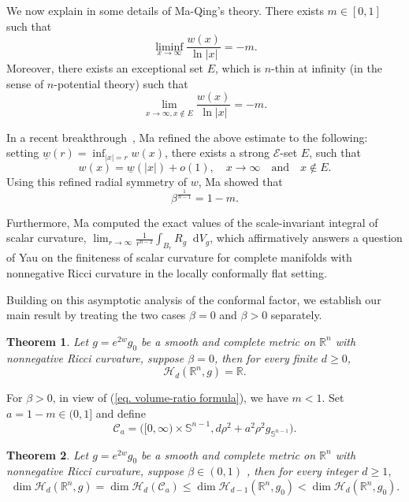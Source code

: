 \documentclass[10pt,a4paper]{amsart}
\newtheorem{theoremx}{Theorem}
\numberwithin{equation}{section}
\newcommand{\R}{\mathbb{R}}
\newcommand{\dd}{\mathop{}\!\mathrm{d}}%
\begin{document}
We now explain in some details of Ma-Qing's theory. There exists $m\in [0,1]$ such that 
\[
    \liminf_{x\to \infty} \frac{w(x)}{\ln |x|}=-m.
\]
Moreover, there exists an exceptional set $E$, which is $n$-thin at infinity (in the sense of $n$-potential theory) such that 
\[
\lim_{x\to \infty, x\notin E} \frac{w(x)}{\ln |x|}=-m.
\]

In a recent breakthrough~\cite{M}, Ma refined the above estimate to the following: setting $\underline{w}(r)=\inf_{|x|=r} w(x)$, there exists a strong  $\mathcal{E}$-set $E$, such that 
\begin{equation} \label{eq:asympradial}
w(x)=\underline{w}(|x|)+o(1), \quad x\to \infty \quad \text{and} \quad x\notin E.
\end{equation}
Using this refined radial symmetry of $w$, Ma \cite{M} showed that 
\begin{equation}\label{eq. volume-ratio formula}
    \beta^{\frac{1}{n-1}}=1-m.
\end{equation}

Furthermore, Ma computed the exact values of the scale-invariant integral of scalar curvature, $\lim_{r\to \infty} \frac{1}{r^{n-2}}\int_{B_r} R_g \dd V_g$, which affirmatively answers a question of Yau on the finiteness of scalar curvature for complete manifolds with nonnegative Ricci curvature in the locally conformally flat setting.

Building on this asymptotic analysis of the conformal factor, we establish our main result by treating the two cases $\beta=0$ and $\beta>0$ separately.

\begin{theoremx} \label{thm: T1}
    Let $g=e^{2w}g_{0}$ be a smooth and complete metric on $\mathbb{R}^n$ with nonnegative Ricci curvature, suppose $\beta=0$, then for every finite $d\ge0$,
\[
 \mathcal{H}_d(\R^n,g)=\R.
\]
\end{theoremx}


{For $\beta>0$, in view of (\ref{eq. volume-ratio formula}), we have $m<1$. Set $a=1-m\in (0,1]$ and define 
\[
\mathcal{C}_a=
    \bigl([0,\infty)\times\mathbb S^{n-1},
    d\rho^2+a^2\rho^2g_{\mathbb S^{n-1}}\bigr).
\]}
\begin{theoremx} \label{thm:T2}
        Let $g=e^{2w}g_{0}$ be a smooth and complete metric on $\mathbb{R}^n$ with nonnegative Ricci curvature, suppose $\beta\in (0,1)$ , then for every integer $d\ge1$,
\[
 \dim \mathcal{H}_d(\R^n,g)=\dim \mathcal{H}_d(\mathcal{C}_a) \leq \dim \mathcal{H}_{d-1}(\mathbb{R}^n, g_0)<\dim \mathcal{H}_{d}(\mathbb{R}^n, g_0).
\]
\end{theoremx}
\end{document}
